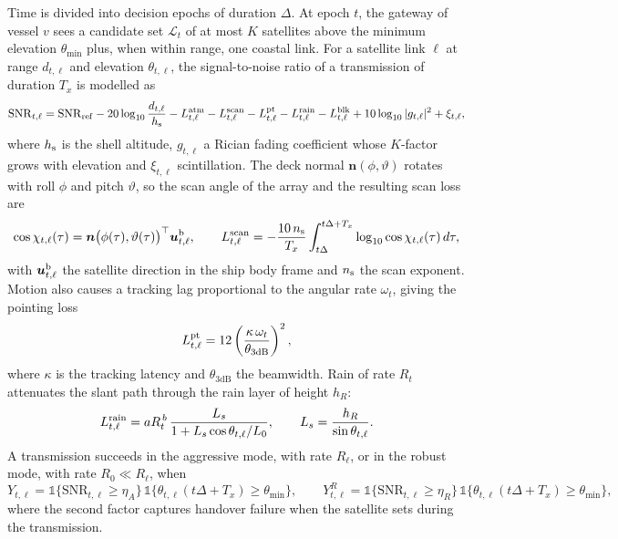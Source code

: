 Time is divided into decision epochs of duration $\Delta$. At epoch $t$, the gateway of vessel $v$ sees a candidate set $\mathcal L_t$ of at most $K$ satellites above the minimum elevation $\theta_{\min}$ plus, when within range, one coastal link. For a satellite link $\ell$ at range $d_{t,\ell}$ and elevation $\theta_{t,\ell}$, the signal-to-noise ratio of a transmission of duration $T_x$ is modelled as
\begin{equation}\label{eq:snr}
\mathrm{SNR}_{t,\ell}=\mathrm{SNR}_{\rm ref}-20\log_{10}\frac{d_{t,\ell}}{h_{\rm s}}-L^{\rm atm}_{t,\ell}-L^{\rm scan}_{t,\ell}-L^{\rm pt}_{t,\ell}-L^{\rm rain}_{t,\ell}-L^{\rm blk}_{t,\ell}+10\log_{10}|g_{t,\ell}|^{2}+\xi_{t,\ell},
\end{equation}
where $h_{\rm s}$ is the shell altitude, $g_{t,\ell}$ a Rician fading coefficient whose $K$-factor grows with elevation and $\xi_{t,\ell}$ scintillation. The deck normal $\bm n(\phi,\vartheta)$ rotates with roll $\phi$ and pitch $\vartheta$, so the scan angle of the array and the resulting scan loss are
\begin{equation}\label{eq:scan}
\cos\chi_{t,\ell}(\tau)=\bm n\big(\phi(\tau),\vartheta(\tau)\big)^{\top}\bm u^{\rm b}_{t,\ell},\qquad
L^{\rm scan}_{t,\ell}=-\frac{10\,n_{\rm s}}{T_x}\int_{t\Delta}^{t\Delta+T_x}\log_{10}\cos\chi_{t,\ell}(\tau)\,d\tau,
\end{equation}
with $\bm u^{\rm b}_{t,\ell}$ the satellite direction in the ship body frame and $n_{\rm s}$ the scan exponent. Motion also causes a tracking lag proportional to the angular rate $\omega_t$, giving the pointing loss
\begin{equation}\label{eq:pointing}
L^{\rm pt}_{t,\ell}=12\left(\frac{\kappa\,\omega_t}{\theta_{3\mathrm{dB}}}\right)^{2},
\end{equation}
where $\kappa$ is the tracking latency and $\theta_{3\mathrm{dB}}$ the beamwidth. Rain of rate $R_t$ attenuates the slant path through the rain layer of height $h_R$:
\begin{equation}\label{eq:rain}
L^{\rm rain}_{t,\ell}=a R_t^{\,b}\,\frac{L_s}{1+L_s\cos\theta_{t,\ell}/L_0},\qquad L_s=\frac{h_R}{\sin\theta_{t,\ell}}.
\end{equation}
A transmission succeeds in the aggressive mode, with rate $R_\ell$, or in the robust mode, with rate $R_0\ll R_\ell$, when
\begin{equation}\label{eq:labels}
Y_{t,\ell}=\mathbb 1\{\mathrm{SNR}_{t,\ell}\ge\eta_A\}\,\mathbb 1\{\theta_{t,\ell}(t\Delta+T_x)\ge\theta_{\min}\},\qquad
Y^{R}_{t,\ell}=\mathbb 1\{\mathrm{SNR}_{t,\ell}\ge\eta_R\}\,\mathbb 1\{\theta_{t,\ell}(t\Delta+T_x)\ge\theta_{\min}\},
\end{equation}
where the second factor captures handover failure when the satellite sets during the transmission.


